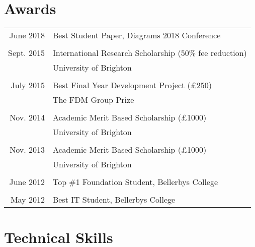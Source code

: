 \documentclass[a4paper,11pt]{article} %
\begin{document}

\section{Awards}

\begin{tabular}{rl}
June 2018 & Best Student Paper, Diagrams 2018 Conference\\
\\
Sept. 2015 & International Research Scholarship (50\% fee reduction)\\ &University of Brighton\\
\\
July 2015 & Best Final Year Development Project (£250)\\ &The FDM Group Prize \\
\\
Nov. 2014 & Academic Merit Based Scholarship (£1000)\\ &University of Brighton \\
\\
Nov. 2013 & Academic Merit Based Scholarship (£1000)\\ &University of Brighton \\
\\
June 2012 & Top \#1 Foundation Student, Bellerbys College \\
\\
May 2012 & Best IT Student, Bellerbys College \\
\end{tabular}





\section{Technical Skills}
\end{document}
